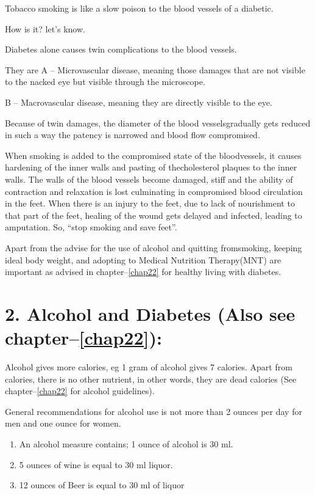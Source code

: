 Tobacco smoking is like a slow poison to the blood vessels of a diabetic.

How is it? let’s know.

Diabetes alone causes twin complications to the blood vessels.

They are A – Microvascular disease, meaning those damages that are not visible to the nacked eye but visible through the microscope.

B – Macrovascular disease, meaning they are directly visible to the eye.

Because of twin damages, the diameter of the blood vessels\break gradually gets reduced in such a way the patency is narrowed and blood flow compromised.

When smoking is added to the compromised state of the blood\break vessels, it causes hardening of the inner walls and pasting of the\break cholesterol plaques to the inner walls. The walls of the blood vessels become damaged, stiff and the ability of contraction and relaxation is lost culminating in compromised blood circulation in the feet. When there is an injury to the feet, due to lack of nourishment to that part of the feet, healing of the wound gets delayed and infected, leading to amputation. So, “stop smoking and save feet”.

Apart from the advise for the use of alcohol and quitting from\break smoking, keeping ideal body weight, and adopting to Medical Nutrition Therapy(MNT) are important as advised in chapter–\ref{chap22} for healthy living with diabetes.


\section*{2. Alcohol and Diabetes (Also see chapter–\ref{chap22}):}

Alcohol gives more calories, eg 1 gram of alcohol gives 7 calories. Apart from calories, there is no other nutrient, in other words, they are dead calories (See chapter–\ref{chap22} for alcohol guidelines).

General recommendations for alcohol use is not more than 2 ounces per day for men and one ounce for women.
\begin{enumerate}[•]
\itemsep=0pt
\item An alcohol measure contains; 1 ounce of alcohol is 30 ml.
\item 5 ounces of wine is equal to 30 ml liquor.
\item 12 ounces of Beer is equal to 30 ml of liquor
\end{enumerate}


